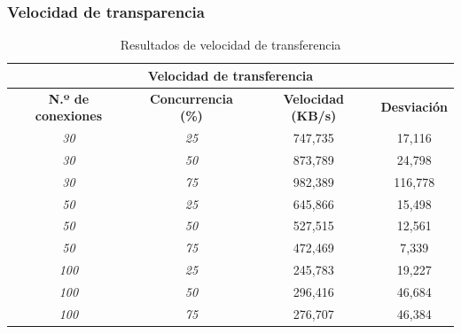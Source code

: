\subsubsection{Velocidad de transparencia}
\begin{table}[!ht]
	\begin{center}
		\begin{tabular}{|c|c|c|c|}
			\hline
			\multicolumn{4}{|c|}{{\bf Velocidad de transferencia}}                            \\ \hline
			{\bf N.º de conexiones} & {\bf Concurrencia (\%)} & {\bf Velocidad (KB/s)} & {\bf Desviación} \\ \hline
			{\it 30}                & {\it 25}                & 747,735    & 17,116           \\ \hline
			{\it 30}                & {\it 50}                & 873,789    & 24,798           \\ \hline
			{\it 30}                & {\it 75}                & 982,389    & 116,778          \\ \hline
			{\it 50}                & {\it 25}                & 645,866    & 15,498           \\ \hline
			{\it 50}                & {\it 50}                & 527,515    & 12,561           \\ \hline
			{\it 50}                & {\it 75}                & 472,469    & 7,339            \\ \hline
			{\it 100}               & {\it 25}                & 245,783    & 19,227           \\ \hline
			{\it 100}               & {\it 50}                & 296,416    & 46,684           \\ \hline
			{\it 100}               & {\it 75}                & 276,707    & 46,384           \\ \hline
		\end{tabular}
		\caption{Resultados de velocidad de transferencia}
		\label{table:rvt}
	\end{center}
\end{table}

